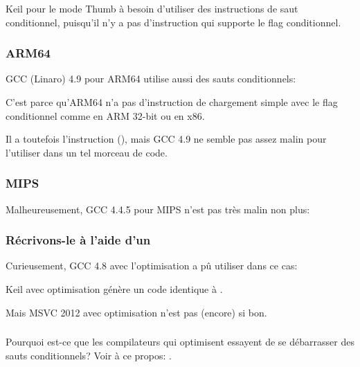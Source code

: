 Keil \Optimizing pour le mode Thumb à besoin d'utiliser des instructions de saut
conditionnel, puisqu'il n'y a pas d'instruction qui supporte le flag conditionnel.



\subsubsection{ARM64}

GCC (Linaro) 4.9 \Optimizing pour ARM64 utilise aussi des sauts conditionnels:



C'est parce qu'ARM64 n'a pas d'instruction de chargement simple avec le flag conditionnel
comme  en ARM 32-bit ou  en x86.

Il a toutefois l'instruction  (),
mais GCC 4.9 ne semble pas assez malin pour l'utiliser dans un tel morceau de code.

\subsubsection{MIPS}

Malheureusement, GCC 4.4.5 pour MIPS n'est pas très malin non plus:



\subsubsection{Récrivons-le à l'aide d'un}




Curieusement, GCC 4.8 avec l'optimisation a pû utiliser  dans ce cas:



Keil avec optimisation génère un code identique à .

Mais MSVC 2012 avec optimisation n'est pas (encore) si bon.

\subsubsection{\Conclusion{}}

Pourquoi est-ce que les compilateurs qui optimisent essayent de se débarrasser des
sauts conditionnels? Voir à ce propos: .
